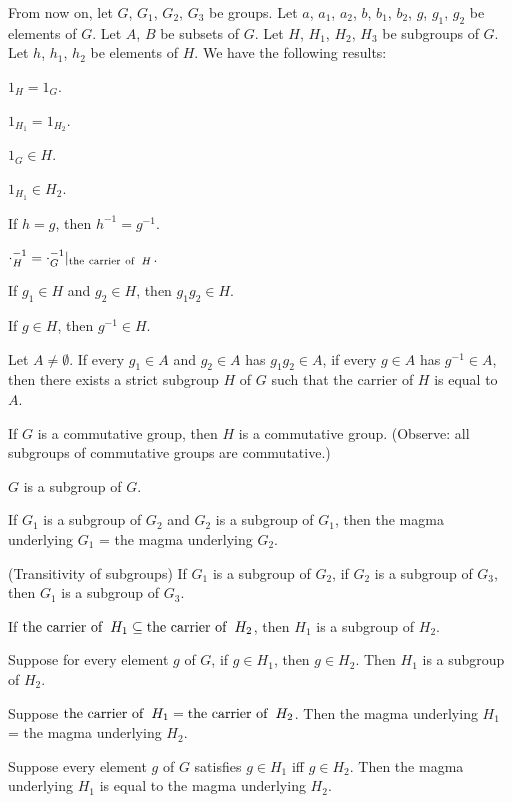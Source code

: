 \documentclass{article}
\begin{document}
From now on, let $G$, $G_{1}$, $G_{2}$, $G_{3}$ be groups.
Let $a$, $a_{1}$, $a_{2}$, $b$, $b_{1}$, $b_{2}$, $g$, $g_{1}$, $g_{2}$
be elements of $G$.
Let $A$, $B$ be subsets of $G$.
Let $H$, $H_{1}$, $H_{2}$, $H_{3}$ be subgroups of $G$.
Let $h$, $h_{1}$, $h_{2}$ be elements of $H$.
We have the following results:
\begin{thm}
\item\label{group2:44} $1_{H}=1_{G}$.
\item\label{group2:45} $1_{H_{1}}=1_{H_{2}}$.
\item\label{group2:46} $1_{G}\in H$.
\item\label{group2:47} $1_{H_{1}}\in H_{2}$.
\item\label{group2:48} If $h=g$, then $h^{-1}=g^{-1}$.
\item\label{group2:49} $\cdot_{H}^{-1}=\cdot_{G}^{-1}|_{\operatorname{the\ carrier\ of\ }H}$.
\item\label{group2:50} If $g_{1}\in H$ and $g_{2}\in H$, then
  $g_{1}g_{2}\in H$.
\item\label{group2:51} If $g\in H$, then $g^{-1}\in H$.
\item\label{group2:52} Let $A\neq\emptyset$.
  If every $g_{1}\in A$ and $g_{2}\in A$ has $g_{1}g_{2}\in A$,
  if every $g\in A$ has $g^{-1}\in A$,
  then there exists a strict subgroup $H$ of $G$ such that the carrier
  of $H$ is equal to $A$.
\item\label{group2:53} If $G$ is a commutative group, then $H$ is a
  commutative group. (Observe: all subgroups of commutative groups are commutative.)
\item\label{group2:54} $G$ is a subgroup of $G$.
\item\label{group2:55} If $G_{1}$ is a subgroup of $G_{2}$ and $G_{2}$
  is a subgroup of $G_{1}$, then the magma underlying $G_{1}$ = the
  magma underlying $G_{2}$.
\item\label{group2:56} (Transitivity of subgroups) If $G_{1}$ is a
  subgroup of $G_{2}$, if $G_{2}$ is a subgroup of $G_{3}$, then $G_{1}$
  is a subgroup of $G_{3}$.
\item\label{group2:57} If $\operatorname{the\ carrier\ of\ }H_{1}\subseteq\operatorname{the\ carrier\ of\ }H_{2}$,
  then $H_{1}$ is a subgroup of $H_{2}$.
\item\label{group2:58} Suppose for every element $g$ of $G$, if $g\in H_{1}$,
  then $g\in H_{2}$.
  Then $H_{1}$ is a subgroup of $H_{2}$.
\item\label{group2:59} Suppose $\operatorname{the\ carrier\ of\ }H_{1}=\operatorname{the\ carrier\ of\ }H_{2}$.
  Then the magma underlying $H_{1}$ = the magma underlying $H_{2}$.
\item\label{group2:60} Suppose every element $g$ of $G$ satisfies $g\in H_{1}$
  iff $g\in H_{2}$. Then the magma underlying $H_{1}$ is equal to the
  magma underlying $H_{2}$.
\end{thm}
\end{document}
